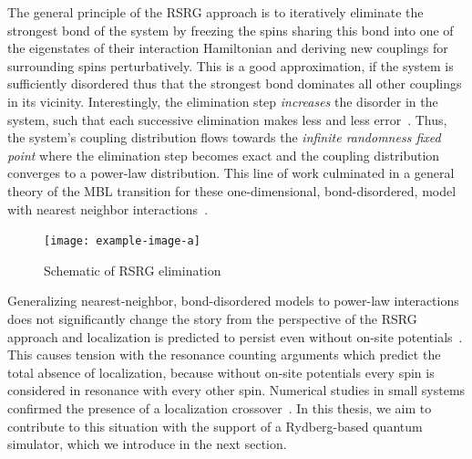 The general principle of the RSRG approach is to iteratively eliminate the strongest bond of the system by freezing the spins sharing this bond into one of the eigenstates of their interaction Hamiltonian and deriving new couplings for surrounding spins perturbatively. This is a good approximation, if the system is sufficiently disordered thus that the strongest bond dominates all other couplings in its vicinity. Interestingly, the elimination step \emph{increases} the disorder in the system, such that each successive elimination makes less and less error~\cite{fisherRandomAntiferromagneticQuantum1994}. Thus, the system's coupling distribution flows towards the \emph{infinite randomness fixed point} where the elimination step becomes exact and the coupling distribution converges to a power-law distribution. This line of work culminated in a general theory of the MBL transition for these one-dimensional, bond-disordered, model with nearest neighbor interactions~\cite{voskTheoryManyBodyLocalization2015}.



\begin{figure}[htb]
	\centering
	\texttt{[image: example-image-a]}
	\caption{Schematic of RSRG elimination}
\end{figure}

Generalizing nearest-neighbor, bond-disordered models to power-law interactions does not significantly change the story from the perspective of the RSRG approach and localization is predicted to persist even without on-site potentials~\cite{moureManyBodyLocalizationTransition2015,moureDisorderedQuantumSpin2018,kutlinRenormalizationLocalizationSmall2020}. This causes tension with the resonance counting arguments which predict the total absence of localization, because without on-site potentials every spin is considered in resonance with every other spin.
Numerical studies in small systems confirmed the presence of a localization crossover~\cite{mohdebEntanglementPropertiesDisordered2020,mohdebExcitedEigenstateEntanglementProperties2022,mohdebGlobalQuenchDynamics2023}. 
In this thesis, we aim to contribute to this situation with the support of a Rydberg-based quantum simulator, which we introduce in the next section.
 

